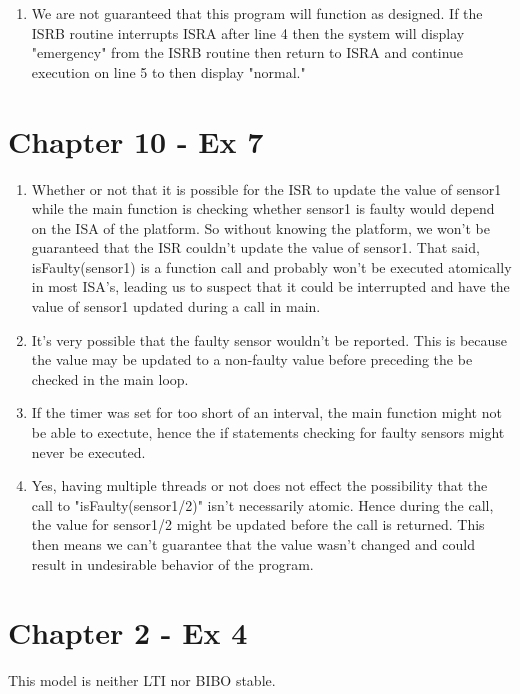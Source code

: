 \documentclass[11pt]{article}
\newenvironment{qparts}{\begin{enumerate}[{(}a{)}]}{\end{enumerate}}
\begin{document}
\begin{qparts}
\item We are not guaranteed that this program will function as designed. If the ISRB routine interrupts ISRA after line 4 then the system will display "emergency" from the ISRB routine then return to ISRA and continue execution on line 5 to then display "normal."
\end{qparts}

\section*{Chapter 10 - Ex 7}
\begin{qparts}
\item
Whether or not that it is possible for the ISR to update the value of sensor1 while the main function is checking whether sensor1 is faulty would depend on the ISA of the platform. So without knowing the platform, we won't be guaranteed that the ISR couldn't update the value of sensor1. That said, isFaulty(sensor1) is a function call and probably won't be executed atomically in most ISA's, leading us to suspect that it could be interrupted and have the value of sensor1 updated during a call in main.

\item
It's very possible that the faulty sensor wouldn't be reported. This is because the value may be updated to a non-faulty value before preceding the be checked in the main loop.

\item
If the timer was set for too short of an interval, the main function might not be able to exectute, hence the if statements checking for faulty sensors might never be executed.

\item
Yes, having multiple threads or not does not effect the possibility that the call to "isFaulty(sensor1/2)" isn't necessarily atomic. Hence during the call, the value for sensor1/2 might be updated before the call is returned. This then means we can't guarantee that the value wasn't changed and could result in undesirable behavior of the program.
\end{qparts}

\section*{Chapter 2 - Ex 4}This model is neither LTI nor BIBO stable.
\end{document}
